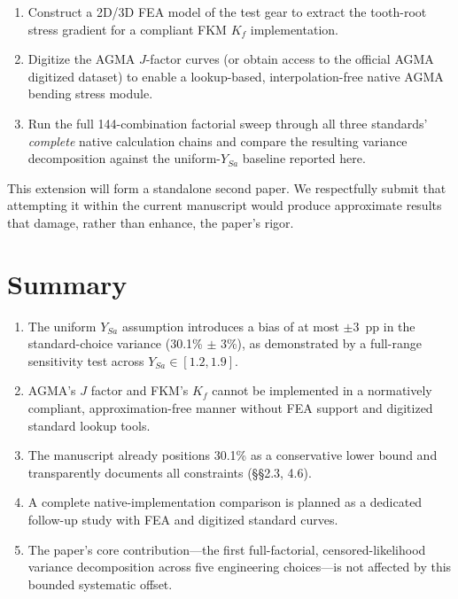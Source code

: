 \documentclass[12pt,a4paper]{article}
\begin{document}
\begin{enumerate}
  \item Construct a 2D/3D FEA model of the test gear to extract the
        tooth-root stress gradient for a compliant FKM $K_f$
        implementation.
  \item Digitize the AGMA $J$-factor curves (or obtain access to the
        official AGMA digitized dataset) to enable a lookup-based,
        interpolation-free native AGMA bending stress module.
  \item Run the full 144-combination factorial sweep through all three
        standards' \emph{complete} native calculation chains and compare
        the resulting variance decomposition against the uniform-$Y_{Sa}$
        baseline reported here.
\end{enumerate}

\noindent This extension will form a standalone second paper. We
respectfully submit that attempting it within the current manuscript
would produce approximate results that damage, rather than enhance,
the paper's rigor.

\section*{Summary}

\begin{enumerate}
  \item The uniform $Y_{Sa}$ assumption introduces a bias of at most
        $\pm 3$~pp in the standard-choice variance (30.1\% $\pm$ 3\%),
        as demonstrated by a full-range sensitivity test across
        $Y_{Sa} \in [1.2, 1.9]$.
  \item AGMA's $J$ factor and FKM's $K_f$ cannot be implemented in a
        normatively compliant, approximation-free manner without FEA
        support and digitized standard lookup tools.
  \item The manuscript already positions 30.1\% as a conservative lower
        bound and transparently documents all constraints (\S\S 2.3,
        4.6).
  \item A complete native-implementation comparison is planned as a
        dedicated follow-up study with FEA and digitized standard
        curves.
  \item The paper's core contribution---the first full-factorial,
        censored-likelihood variance decomposition across five
        engineering choices---is not affected by this bounded
        systematic offset.
\end{enumerate}
\end{document}
